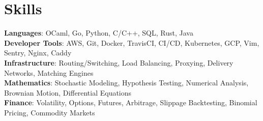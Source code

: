 \documentclass[letterpaper,11pt]{article}
\begin{document}
\vspace{-5pt}

%
\section{Skills}
 \begin{itemize}[leftmargin=0.15in, label={}]
    \small{\item{
     \textbf{Languages}{: OCaml, Go, Python, C/C++, SQL, Rust, Java} \\
     \textbf{Developer Tools}{: AWS, Git, Docker, TravisCI, CI/CD, Kubernetes, GCP, Vim, Sentry, Nginx, Caddy} \\
     \textbf{Infrastructure}{: Routing/Switching, Load Balancing, Proxying, Delivery Networks, Matching Engines}\\
     \textbf{Mathematics}{: Stochastic Modeling, Hypothesis Testing, Numerical Analysis, Brownian Motion, Differential Equations}\\
     \textbf{Finance}{: Volatility, Options, Futures, Arbitrage, Slippage Backtesting, Binomial Pricing, Commodity Markets}
    }}
 \end{itemize}


\end{document}
